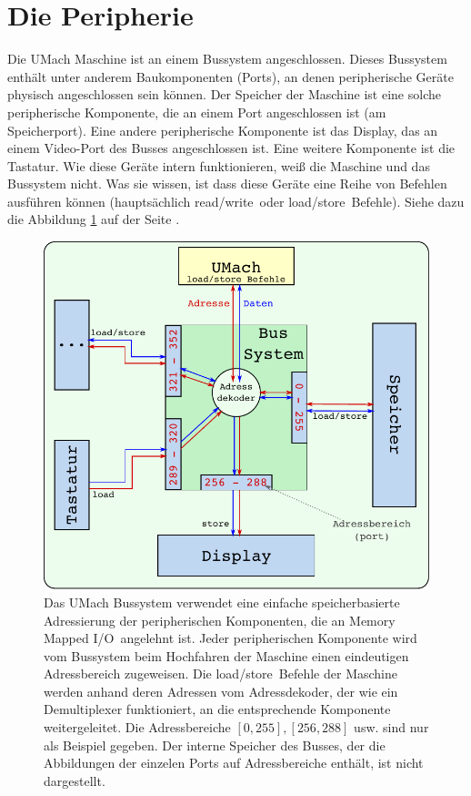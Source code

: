 \section{Die Peripherie}
Die UMach Maschine ist an einem \gls{Bussystem} angeschlossen.
Dieses Bussystem enthält unter anderem Baukomponenten (Ports), an denen
peripherische Geräte physisch angeschlossen sein können. Der
\gls{Speicher} der Maschine ist eine solche peripherische
Komponente, die an einem Port angeschlossen ist (am
Speicherport). Eine andere peripherische Komponente ist das
Display, das an einem Video-Port des Busses angeschlossen ist. Eine weitere
Komponente ist die Tastatur. Wie diese Geräte intern funktionieren, weiß die
Maschine und das Bussystem nicht. Was sie \glqq wissen\grqq, ist dass diese
Geräte eine Reihe von Befehlen ausführen können (hauptsächlich \glqq
read/write\grqq\ oder \glqq load/store\grqq\ Befehle). Siehe dazu die Abbildung
\ref{fig:UMach-Bussystem} auf der Seite \pageref{fig:UMach-Bussystem}.

\begin{figure}
  \centering
  \includegraphics{img/UMach-Bus}
  \caption[Das UMach Bussystem]
          {Das UMach Bussystem verwendet eine einfache speicherbasierte
          Adressierung der peripherischen Komponenten, die an
          \glqq Memory Mapped I/O\grqq\ angelehnt ist. Jeder peripherischen
          Komponente wird vom Bussystem beim Hochfahren der Maschine einen
          eindeutigen Adressbereich zugeweisen.
          Die \glqq load/store\grqq\ Befehle der Maschine werden anhand deren
          Adressen vom Adressdekoder, der wie ein Demultiplexer funktioniert,
          an die entsprechende Komponente weitergeleitet. Die
          Adressbereiche $[0,255], [256,288]$ usw. sind nur als
          Beispiel gegeben. Der interne Speicher des Busses, der die
          Abbildungen der einzelen Ports auf Adressbereiche enthält, ist nicht
          dargestellt.}
  \label{fig:UMach-Bussystem}
\end{figure}



